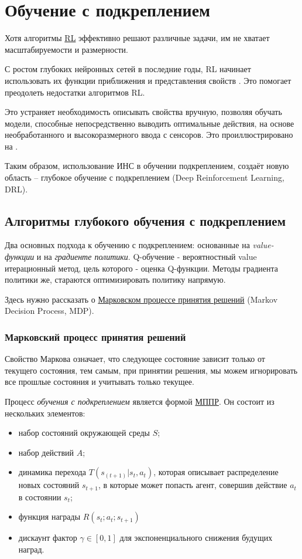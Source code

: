 \section{Обучение с подкреплением} \label{ch1:rl}

Хотя алгоритмы \hyperref[acr:rl]{RL} эффективно решают различные задачи, им не хватает масштабируемости и размерности.

С ростом глубоких нейронных сетей в последние годы, RL начинает использовать их функции приближения и представления свойств \cite{HORNIK1991251}. Это помогает преодолеть недостатки алгоритмов RL.

Это устраняет необходимость описывать свойства вручную, позволяя обучать модели, способные непосредственно выводить оптимальные действия, на основе необработанного и высокоразмерного ввода с сенсоров. Это проиллюстрировано на .

Таким образом, использование ИНС в обучении подкреплением, создаёт новую область – глубокое обучение с подкреплением (Deep Reinforcement Learning, DRL).


\subsection{Алгоритмы глубокого обучения с подкреплением}

Два основных подхода к обучению с подкреплением: основанные на \textit{value-функции} и на \textit{градиенте политики}. Q-обучение - вероятностный value итерационный метод, цель которого - оценка Q-функции. Методы градиента политики же, стараются оптимизировать политику напрямую.

Здесь нужно рассказать о \hyperref[acr:mdp]{Марковском процессе принятия решений} (Markov Decision Process, MDP).

\subsubsection{Марковский процесс принятия решений}

Свойство Маркова означает, что следующее состояние зависит только от текущего состояния, тем самым, при принятии решения, мы можем игнорировать все прошлые состояния и учитывать только текущее.

Процесс {\itshape обучения с подкреплением} является формой \hyperref[acr:mdp]{МППР}. Он состоит из нескольких элементов:

\begin{itemize}
	\item набор состояний окружающей среды $S$;
	\item набор действий $A$;
	\item динамика перехода $T(s_{(t+1)}|s_t, a_t)$, которая описывает распределение новых состояний $s_{t+1}$, в которые может попасть агент, совершив действие $a_t$ в состоянии $s_t$;
	\item функция награды $R(s_t; a_t; s_{t+1})$
	\item дискаунт фактор $\gamma \in [0, 1]$ для экспоненциального снижения будущих наград.
\end{itemize}


